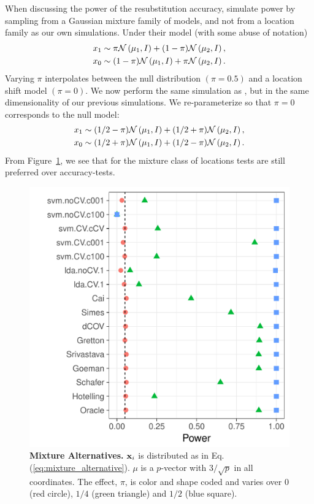 \documentclass[]{bio}
\begin{document}
When discussing the power of the resubstitution accuracy, \cite{golland_permutation_2005} simulate power by sampling from a Gaussian mixture family of models, and not from a location family as our own simulations. 
Under their model (with some abuse of notation)
\begin{align*}
\begin{split}
x_1 & \sim \pi \mathcal{N}\left(\mu_1,I\right)+ (1-\pi) \mathcal{N}\left(\mu_2,I\right), \\
x_0 & \sim (1-\pi) \mathcal{N}\left(\mu_1,I\right)+ \pi \mathcal{N}\left(\mu_2,I\right).
\end{split}
\end{align*}
Varying $\pi$ interpolates between the null distribution $(\pi=0.5)$ and a location shift model $(\pi=0)$. 
We now perform the same simulation as \cite{golland_permutation_2005}, but in the same dimensionality of our previous simulations.
We re-parameterize so that $\pi=0$ corresponds to the null model:
\begin{align}
\begin{split}
\label{eq:mixture_alternative}
x_1 & \sim (1/2-\pi) \mathcal{N}\left(\mu_1,I\right)+ (1/2+\pi) \mathcal{N}\left(\mu_2,I\right), \\
x_0 & \sim (1/2+\pi) \mathcal{N}\left(\mu_1,I\right)+ (1/2-\pi) \mathcal{N}\left(\mu_2,I\right).	
\end{split}
\end{align}
From Figure~\ref{fig:file12}, we see that for the mixture class of \cite{golland_permutation_2005} locations tests are still preferred over accuracy-tests. 


\begin{figure}[ht]
	\centering
	\includegraphics[width=0.7\columnwidth]{"art/file12"}
	\caption{\textbf{Mixture Alternatives.} $\mathbf{x}_i$ is distributed as in Eq.(\ref{eq:mixture_alternative}). 
		$\mu$ is a $p$-vector with $3/\sqrt{p}$ in all coordinates.
		The effect, $\pi$, is color and shape coded and varies over $0$ (red circle), $1/4$ (green triangle) and $1/2$ (blue square). }
	\label{fig:file12}
\end{figure}
\end{document}
